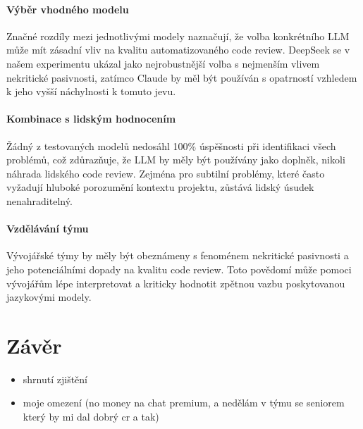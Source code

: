 \documentclass[12pt, a4paper]{article}
\begin{document}
\paragraph{Výběr vhodného modelu} Značné rozdíly mezi jednotlivými modely naznačují, že volba konkrétního LLM může mít zásadní vliv na kvalitu automatizovaného code review. DeepSeek se v našem experimentu ukázal jako nejrobustnější volba s nejmenším vlivem nekritické pasivnosti, zatímco Claude by měl být používán s opatrností vzhledem k jeho vyšší náchylnosti k tomuto jevu.

\paragraph{Kombinace s lidským hodnocením} Žádný z testovaných modelů nedosáhl 100\% úspěšnosti při identifikaci všech problémů, což zdůrazňuje, že LLM by měly být používány jako doplněk, nikoli náhrada lidského code review. Zejména pro subtilní problémy, které často vyžadují hluboké porozumění kontextu projektu, zůstává lidský úsudek nenahraditelný.

\paragraph{Vzdělávání týmu} Vývojářské týmy by měly být obeznámeny s fenoménem nekritické pasivnosti a jeho potenciálními dopady na kvalitu code review. Toto povědomí může pomoci vývojářům lépe interpretovat a kriticky hodnotit zpětnou vazbu poskytovanou jazykovými modely.

\section{Závěr}
\begin{itemize}
  \item shrnutí zjištění
  \item moje omezení (no money na chat premium, a nedělám v týmu se seniorem který by mi dal dobrý cr a tak)
\end{itemize}



\end{document}
